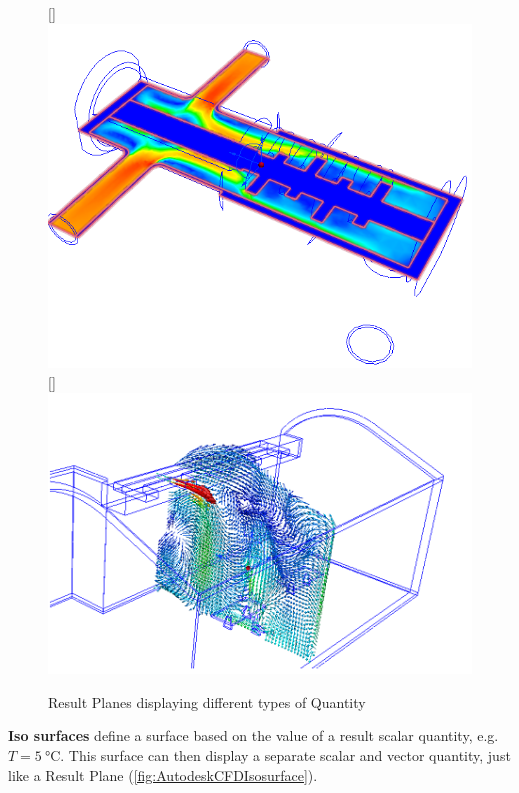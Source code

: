\begin{figure}
    \centering
    [\linewidth]{\includegraphics[width=\linewidth]{Ch20Research/figures/autodesk_cfd_results_planes_scalar.png}}
    [\linewidth]{\includegraphics[width=\linewidth]{Ch20Research/figures/autodesk_cfd_results_planes_vector.png}}
    \caption{Result Planes displaying different types of Quantity}
    \label{fig:AutodeskCFDResultsPlane}
\end{figure}

\textbf{Iso surfaces} define a surface based on the value of a result scalar quantity, e.g. $T = \SI{5}{\celsius}$.
This surface can then display a separate scalar and vector quantity, just like a Result Plane (\cref{fig:AutodeskCFDIsosurface}).

